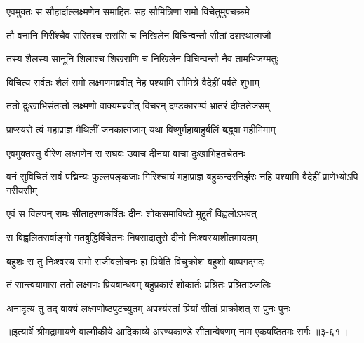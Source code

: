 \twolineshloka
{एवमुक्तः स सौहार्दाल्लक्ष्मणेन समाहितः}
{सह सौमित्रिणा रामो विचेतुमुपचक्रमे} %

\twolineshloka
{तौ वनानि गिरींश्चैव सरितश्च सरांसि च}
{निखिलेन विचिन्वन्तौ सीतां दशरथात्मजौ} %

\twolineshloka
{तस्य शैलस्य सानूनि शिलाश्च शिखराणि च}
{निखिलेन विचिन्वन्तौ नैव तामभिजग्मतुः} %

\twolineshloka
{विचित्य सर्वतः शैलं रामो लक्ष्मणमब्रवीत्}
{नेह पश्यामि सौमित्रे वैदेहीं पर्वते शुभाम्} %

\twolineshloka
{ततो दुःखाभिसंतप्तो लक्ष्मणो वाक्यमब्रवीत्}
{विचरन् दण्डकारण्यं भ्रातरं दीप्ततेजसम्} %

\twolineshloka
{प्राप्स्यसे त्वं महाप्राज्ञ मैथिलीं जनकात्मजाम्}
{यथा विष्णुर्महाबाहुर्बलिं बद्ध्वा महीमिमाम्} %

\twolineshloka
{एवमुक्तस्तु वीरेण लक्ष्मणेन स राघवः}
{उवाच दीनया वाचा दुःखाभिहतचेतनः} %

\threelineshloka
{वनं सुविचितं सर्वं पद्मिन्यः फुल्लपङ्कजाः}
{गिरिश्चायं महाप्राज्ञ बहुकन्दरनिर्झरः}
{नहि पश्यामि वैदेहीं प्राणेभ्योऽपि गरीयसीम्} %

\twolineshloka
{एवं स विलपन् रामः सीताहरणकर्षितः}
{दीनः शोकसमाविष्टो मुहूर्तं विह्वलोऽभवत्} %

\twolineshloka
{स विह्वलितसर्वाङ्गो गतबुद्धिर्विचेतनः}
{निषसादातुरो दीनो निःश्वस्याशीतमायतम्} %

\twolineshloka
{बहुशः स तु निःश्वस्य रामो राजीवलोचनः}
{हा प्रियेति विचुक्रोश बहुशो बाष्पगद्गदः} %

\twolineshloka
{तं सान्त्वयामास ततो लक्ष्मणः प्रियबान्धवम्}
{बहुप्रकारं शोकार्तः प्रश्रितः प्रश्रिताञ्जलिः} %

\twolineshloka
{अनादृत्य तु तद् वाक्यं लक्ष्मणोष्ठपुटच्युतम्}
{अपश्यंस्तां प्रियां सीतां प्राक्रोशत् स पुनः पुनः} %


॥इत्यार्षे श्रीमद्रामायणे वाल्मीकीये आदिकाव्ये अरण्यकाण्डे सीतान्वेषणम् नाम एकषष्ठितमः सर्गः ॥३-६१॥
